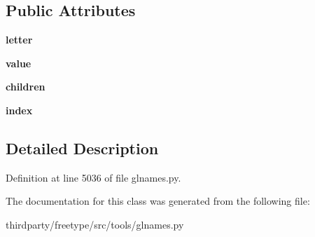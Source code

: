 \subsection*{Public Attributes}
\begin{DoxyCompactItemize}
\item 
\mbox{\label{classglnames_1_1_string_node_a12c9360d42e3430603df983cc355d78c}} 
{\bfseries letter}
\item 
\mbox{\label{classglnames_1_1_string_node_aab7ade42e54748a63e96e81227b95958}} 
{\bfseries value}
\item 
\mbox{\label{classglnames_1_1_string_node_abf8942a8746b3f0fe4230d3e79ab6f77}} 
{\bfseries children}
\item 
\mbox{\label{classglnames_1_1_string_node_aa4e07c3aff8f165cb9c84505a61bbaed}} 
{\bfseries index}
\end{DoxyCompactItemize}


\subsection{Detailed Description}


Definition at line 5036 of file glnames.\+py.



The documentation for this class was generated from the following file\+:\begin{DoxyCompactItemize}
\item 
thirdparty/freetype/src/tools/glnames.\+py\end{DoxyCompactItemize}
